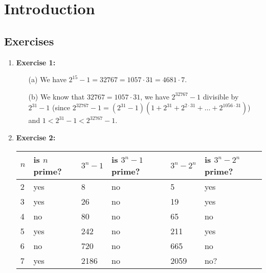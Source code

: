 \documentclass{article} %
\begin{document}
    \section*{Introduction} %
    
    \subsection*{Exercises} %
    
    \begin{enumerate}
        \item \textbf{Exercise 1:}
        \begin{itemize}
            \item[(a)] We have \(2^{15} - 1 = 32767 = 1057 \cdot 31 = 4681 \cdot 7\).
            \item[(b)] We know that \(32767 = 1057 \cdot 31\), we have \(2^{32767} - 1\) divisible by \(2^{31} - 1\) (since \(2^{32767} - 1 = (2^{31} - 1)(1 + 2^{31} + 2^{2 \cdot 31} + \dots + 2^{1056 \cdot 31})\)) and \(1 < 2^{31} - 1 < 2^{32767} - 1\).
        \end{itemize}
        
        \item \textbf{Exercise 2:}
        \begin{table}[h]
            \begin{tabular}{llllll}
                \hline
                \textbf{\(n\)} & \textbf{is \(n\) prime?} & \textbf{\(3^{n} - 1\)} & \textbf{is \(3^{n} - 1\) prime?} & \textbf{\(3^{n} - 2^{n}\)} & \textbf{is \(3^{n} - 2^{n}\) prime?} \\ \hline
                2            & yes                    & 8                    & no                             & 5                        & yes                                \\
                3            & yes                    & 26                   & no                             & 19                       & yes                                \\
                4            & no                     & 80                   & no                             & 65                       & no                                 \\
                5            & yes                    & 242                  & no                             & 211                      & yes                                \\
                6            & no                     & 720                  & no                             & 665                      & no                                 \\
                7            & yes                    & 2186                 & no                             & 2059                     & no?                                \\ \hline
            \end{tabular}
        \end{table}


\end{enumerate}
\end{document}
